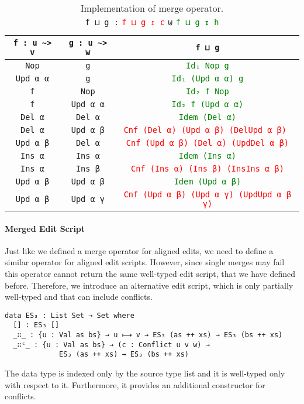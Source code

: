 \documentclass{sigplanconf}
\theoremstyle{plain}
\begin{document}
	\begin{table*}[t]
	\centering
	\begin{tabular}{| c | c | c |}
	\hline
	\texttt{f : u \textasciitilde> v} & \texttt{g : u \textasciitilde> w} &  \texttt{f ⊔ g} 
	\\ \hline
	\texttt{Nop} & \texttt{g} & \textcolor{Green}{\texttt{Id₁ Nop g}} 
	\\ \hline
	\texttt{Upd α α} & \texttt{g} & \textcolor{Green}{\texttt{Id₁ (Upd α α) g}} 
	\\ \hline
	\texttt{f} & \texttt{Nop} & \textcolor{Green}{\texttt{Id₂ f Nop}} 
	\\ \hline
	\texttt{f} & \texttt{Upd α α} & \textcolor{Green}{\texttt{Id₂ f (Upd α α)}} 
	\\ \hline
	\texttt{Del α} & \texttt{Del α} & \textcolor{Green}{\texttt{Idem (Del α)}}
	\\ \hline
	\texttt{Del α} & \texttt{Upd α β} & \textcolor{Red}{\texttt{Cnf (Del α) (Upd α β) (DelUpd α β) }}
	\\ \hline
	\texttt{Upd α β} & \texttt{Del α} & \textcolor{Red}{\texttt{Cnf (Upd α β) (Del α) (UpdDel α β)}}
	\\ \hline
	\texttt{Ins α} & \texttt{Ins α} & \textcolor{Green}{\texttt{Idem (Ins α)}} 
	\\	\hline
	\texttt{Ins α} & \texttt{Ins β} & \textcolor{Red}{\texttt{Cnf (Ins α) (Ins β) (InsIns α β)}}
	\\	\hline
	\texttt{Upd α β} & \texttt{Upd α β} & \textcolor{Green}{\texttt{Idem (Upd α β)}}
	\\	\hline
	\texttt{Upd α β} & \texttt{Upd α γ} & \textcolor{Red}{\texttt{Cnf (Upd α β) (Upd α γ) (UpdUpd α β γ)}}
	\\ \hline
	\end{tabular}
	
	\captionsetup{singlelinecheck=false, justification=centering}

	\caption{Implementation of merge operator. \\
	 \texttt{f ⊔ g :} \textcolor{Red}{\texttt{f ⊔ g ↥ c}} \texttt{⊎} \textcolor{Green}{\texttt{f ⊔ g ↧ h}}}	 
	\label{table:merge}
	\end{table*}

	\paragraph{Merged Edit Script}
	Just like we defined a merge operator for aligned edits, we need to 
	define a similar operator for aligned edit scripts.
	However, since single merges may fail this operator cannot return 
	the same well-typed edit script, that we have defined before.
	Therefore, we introduce an alternative edit script, which is only partially 
	well-typed and that can include conflicts.
\begin{verbatim}
data ES₃ : List Set → Set where
  [] : ES₃ []
  _∷_ : {u : Val as bs} → u ⟼ v → ES₃ (as ++ xs) → ES₃ (bs ++ xs)
  _∷ᶜ_ : {u : Val as bs} → (c : Conflict u v w) → 
             ES₃ (as ++ xs) → ES₃ (bs ++ xs)
\end{verbatim}
	The data type is indexed only by the source type list and it is well-typed
	only with respect to it. Furthermore, it provides an additional constructor
	for conflicts. 
\end{document}
